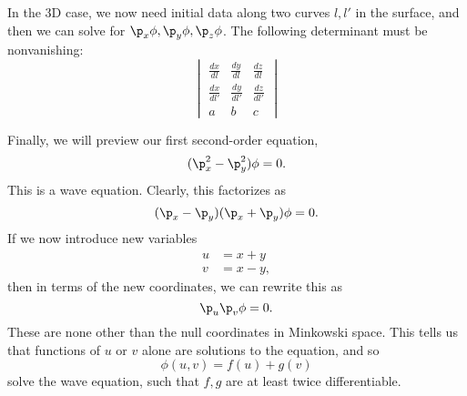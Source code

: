 In the 3D case, we now need initial data along two curves $l,l'$ in the surface, and then we can solve for $\p_x \phi,\p_y\phi,\p_z\phi$. The following determinant must be nonvanishing:
\begin{equation}
    \begin{vmatrix}
    \frac{dx}{dl} & \frac{dy}{dl} & \frac{dz}{dl}\\
    \frac{dx}{dl'} & \frac{dy}{dl'} & \frac{dz}{dl'}\\
    a & b & c
    \end{vmatrix}
\end{equation}

Finally, we will preview our first second-order equation,
\begin{equation}
    (\p_x^2 - \p_y^2) \phi =0.
\end{equation}
This is a wave equation. Clearly, this factorizes as
\begin{equation}
    (\p_x - \p_y)(\p_x+\p_y)\phi=0.
\end{equation}
If we now introduce new variables
\begin{align}
    u &= x+y\\
    v &= x-y,
\end{align}
then in terms of the new coordinates, we can rewrite this as
\begin{equation}
    \p_u \p_v \phi =0.
\end{equation}
These are none other than the null coordinates in Minkowski space. This tells us that functions of $u$ or $v$ alone are solutions to the equation, and so
\begin{equation}
    \phi(u,v)=f(u) + g(v)
\end{equation}
solve the wave equation, such that $f,g$ are at least twice differentiable.